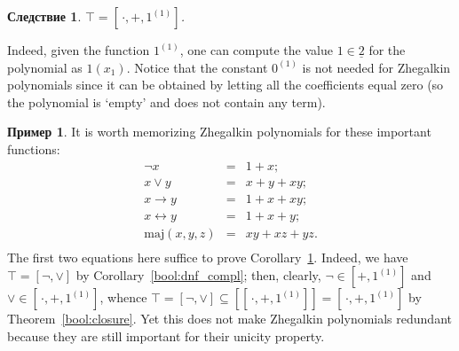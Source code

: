 \documentclass[12pt,notitlepage]{article}
\theoremstyle{plain}
\newtheorem{corr}[thm]{Следствие}
\theoremstyle{definition}
\newtheorem{exm}[thm]{Пример}
\theoremstyle{plain}
\newcommand{\sbs}{\subseteq}
\newcommand{\ul}[1]{\underline{#1}}
\newcommand{\1}{\mathbf{1}}
\newcommand{\0}{\mathbf{0}}
\begin{document}
\begin{corr}\label{bool:poly_compl}
	$\top = [\,{\cdot}, {+}, 1^{(1)}]$.
\end{corr}
Indeed, given the function $1^{(1)}$, one can compute the value $1 \in \ul{2}$ for the polynomial as $1(x_1)$. Notice that the constant $0^{(1)}$ is not needed for Zhegalkin polynomials since it can be obtained by letting all the coefficients equal zero (so the polynomial is `empty' and does not contain any term).
\begin{exm}
	It is worth memorizing Zhegalkin polynomials for these important functions:
	$$
	\begin{array}{rcl}
		\neg x &=& 1 + x;\\
		x \vee y &=& x + y + xy;\\
		x \to y &=& 1 + x + xy;\\
		x \leftrightarrow y &=& 1 + x + y;\\
		\mathrm{maj}(x, y, z) &=& xy + xz + yz.\\
	\end{array}
	$$
	The first two equations here suffice to prove Corollary~\ref{bool:poly_compl}. Indeed, we have $\top = [{\neg}, {\vee}]$ by Corollary~\ref{bool:dnf_compl}; then, clearly, ${\neg} \in [{+}, 1^{(1)}]$ and ${\vee} \in [\,{\cdot}, {+}, 1^{(1)}]$, whence $\top = [{\neg}, {\vee}] \sbs [[\,{\cdot}, {+}, 1^{(1)}]] = [\,{\cdot}, {+}, 1^{(1)}]$ by Theorem~\ref{bool:closure}. Yet this does not make Zhegalkin polynomials redundant because they are still important for their unicity property. 
\end{exm}
\end{document}
